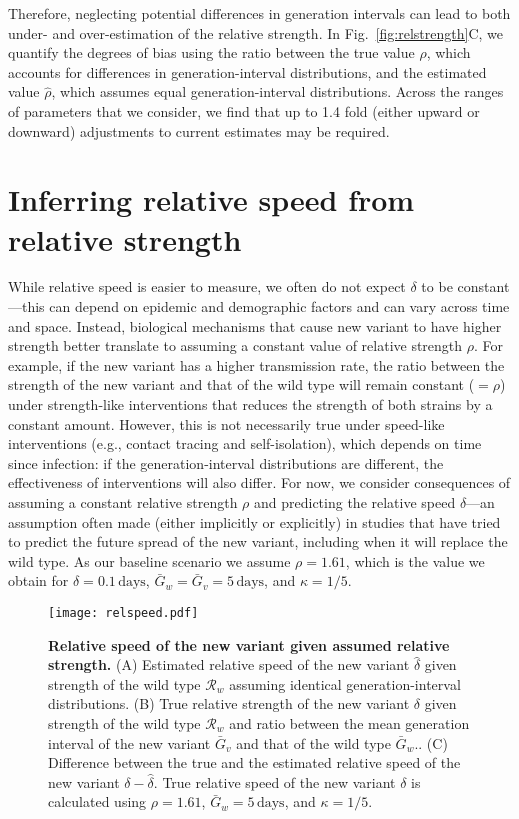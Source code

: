 \documentclass[12pt]{article}
\newcommand{\fref}[1]{Fig.~\ref{fig:#1}}
\newcommand{\RR}{\ensuremath{{\mathcal R}}\xspace}
\begin{document}
Therefore, neglecting potential differences in generation intervals can lead to both under- and over-estimation of the relative strength.
In \fref{relstrength}C, we quantify the degrees of bias using the ratio between the true value $\rho$, which accounts for differences in generation-interval distributions, and the estimated value $\hat{\rho}$, which assumes equal generation-interval distributions.
Across the ranges of parameters that we consider, we find that up to 1.4 fold (either upward or downward) adjustments to current estimates may be required.

\section{Inferring relative speed from relative strength}

While relative speed is easier to measure, we often do not expect $\delta$ to be constant---this can depend on epidemic and demographic factors and can vary across time and space.
Instead, biological mechanisms that cause new variant to have higher strength better translate to assuming a constant value of relative strength $\rho$.
For example, if the new variant has a higher transmission rate, the ratio between the strength of the new variant and that of the wild type will remain constant ($=\rho$) under strength-like interventions that reduces the strength of both strains by a constant amount.
However, this is not necessarily true under speed-like interventions (e.g., contact tracing and self-isolation), which depends on time since infection: if the generation-interval distributions are different, the effectiveness of interventions will also differ.
For now, we consider consequences of assuming a constant relative strength $\rho$ and predicting the relative speed $\delta$---an assumption often made (either implicitly or explicitly) in studies that have tried to predict the future spread of the new variant, including when it will replace the wild type.
As our baseline scenario we assume $\rho = 1.61$, which is the value we obtain for $\delta=0.1\,\textrm{days}$, $\bar{G}_w = \bar{G}_v = 5\,\textrm{days}$, and $\kappa = 1/5$.

\begin{figure}[!th]
\texttt{[image: relspeed.pdf]}
\caption{
\textbf{Relative speed of the new variant given assumed relative strength.}
(A) Estimated relative speed of the new variant $\hat{\delta}$ given strength of the wild type $\RR_w$ assuming identical generation-interval distributions.
(B) True relative strength of the new variant $\delta$ given strength of the wild type $\RR_w$ and ratio between the mean generation interval of the new variant $\bar{G}_v$ and that of the wild type $\bar{G}_w$..
(C) Difference between the true and the estimated relative speed of the new variant $\delta - \hat{\delta}$.
True relative speed of the new variant $\delta$ is calculated using $\rho=1.61$, $\bar{G}_w = 5\,\textrm{days}$, and $\kappa=1/5$.
}
\label{fig:relspeed}
\end{figure}
\end{document}

